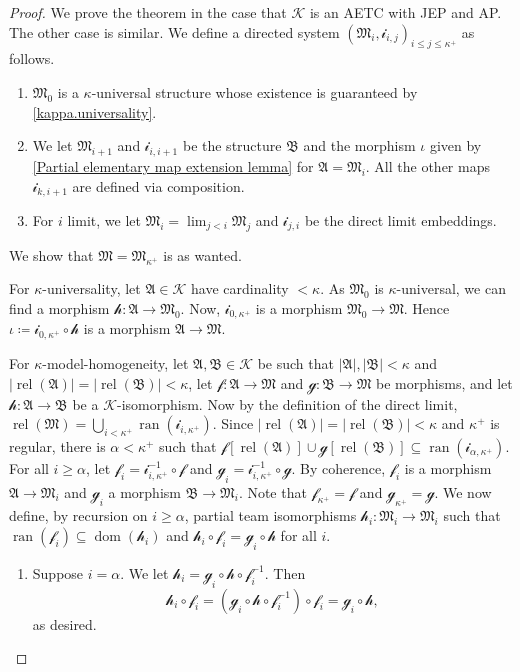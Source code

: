 \documentclass[a4paper]{amsart}
\theoremstyle{definition}
\theoremstyle{remark}
\newcommand{\A}{\mathcal{A}}
\newcommand{\B}{\mathcal{B}}
\newcommand{\M}{\mathcal{M}}
\DeclareMathOperator{\dom}{dom}
\DeclareMathOperator{\ran}{ran}
\DeclareMathOperator{\rel}{rel}
\newcommand{\K}{\mathcal{K}}
\theoremstyle{definition}
\renewcommand{\A}{\mathfrak{A}}
\renewcommand{\B}{\mathfrak{B}}
\renewcommand{\M}{\mathfrak{M}}
\newcommand{\f}{\mathcal{f}}
\newcommand{\g}{\mathcal{g}}
\newcommand{\h}{\mathcal{h}}
\begin{document}
\begin{proof}
    \renewcommand{\i}{\mathcal{i}}
    We prove the theorem in the case that $\K$ is an AETC with JEP and AP. The other case is similar. We define a directed system $(\M_i,\i_{i,j})_{i\leq j\leq\kappa^+}$ as follows.
    \begin{enumerate}
        \item $\M_0$ is a $\kappa$-universal structure whose existence is guaranteed by \cref{kappa.universality}.
        \item We let $\M_{i+1}$ and $\i_{i,i+1}$ be the structure $\B$ and the morphism $\iota$ given by \cref{Partial elementary map extension lemma} for $\A = \M_i$. All the other maps $\i_{k,i+1}$ are defined via composition.
        \item For $i$ limit, we let $\M_i = \lim_{j<i}\M_j$ and $\i_{j,i}$ be the direct limit embeddings.
    \end{enumerate}
    We show that $\M = \M_{\kappa^+}$ is as wanted.

    For $\kappa$-universality, let $\A\in\K$ have cardinality $<\kappa$. As $\M_0$ is $\kappa$-universal, we can find a morphism $\h\colon\A\to\M_0$. Now, $\i_{0,\kappa^+}$ is a morphism $\M_0\to\M$. Hence $\iota \coloneqq \i_{0,\kappa^+}\circ\h$ is a morphism $\A\to\M$.

    For $\kappa$-model-homogeneity, let $\A,\B\in\K$ be such that $|\A|,|\B|<\kappa$ and $|\rel(\A)|=|\rel(\B)|<\kappa$, let $\f\colon\A\to\M$ and $\g\colon\B\to\M$ be morphisms, and let $\h\colon\A\to\B$ be a $\K$-isomorphism. Now by the definition of the direct limit, $\rel(\M) = \bigcup_{i<\kappa^+}\ran(\i_{i,\kappa^+})$. Since $|\rel(\A)|=|\rel(\B)|<\kappa$ and $\kappa^+$ is regular, there is $\alpha<\kappa^+$ such that $\f[\rel(\A)]\cup\g[\rel(\B)]\subseteq\ran(\i_{\alpha,\kappa^+})$. For all $i\geq\alpha$, let $\f_i = \i_{i,\kappa^+}^{-1}\circ\f$ and $\g_i = \i_{i,\kappa^+}^{-1}\circ\g$. By coherence, $\f_i$ is a morphism $\A\to\M_i$ and $\g_i$ a morphism $\B\to\M_i$. Note that $\f_{\kappa^+} = \f$ and $\g_{\kappa^+} = \g$. We now define, by recursion on $i\geq\alpha$, partial team isomorphisms $\h_i\colon\M_i\to\M_i$ such that $\ran(\f_i)\subseteq\dom(\h_i)$ and $\h_i\circ\f_i = \g_i\circ\h$ for all $i$.
    \begin{enumerate}
        \item Suppose $i=\alpha$. We let $\h_i = \g_i\circ\h\circ\f_i^{-1}$. Then
        \[
            \h_i\circ\f_i = (\g_i\circ\h\circ\f_i^{-1})\circ\f_i = \g_i\circ\h,
        \]
        as desired.


\end{enumerate}
\end{proof}
\end{document}
